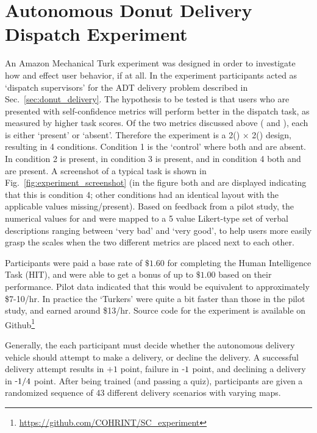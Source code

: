 \section{Autonomous Donut Delivery Dispatch Experiment} \label{sec:exp_results}
An Amazon Mechanical Turk %
experiment was designed in order to investigate how \xQ{} and \xO{} effect user behavior, if at all. In the experiment participants acted as `dispatch supervisors' for the ADT delivery problem described in Sec.~\ref{sec:donut_delivery}. 
The hypothesis to be tested is that users who are presented with self-confidence metrics will perform better in the dispatch task, as measured by higher task scores. 
Of the two \famsec{} metrics discussed above (\xQ{} and \xO), each is either `present' or `absent'. Therefore the experiment is a 2(\xQ) $\times$ 2(\xO) design, resulting in 4 conditions. Condition 1 is the `control' where both \xQ{} and \xO{} are absent. In condition 2 \xQ{} is present, in condition 3 \xO{} is present, and in condition 4 both \xQ{} and \xO{} are present. A screenshot of a typical task is shown in Fig.~\ref{fig:experiment_screenshot} (in the figure both \xQ{} and \xO{} are displayed indicating that this is condition 4; other conditions had an identical layout with the applicable values missing/present). Based on feedback from a pilot study, the numerical values for \xQ{} and \xO{} were mapped to a 5 value Likert-type set of verbal descriptions ranging between `very bad' and `very good', to help users more easily grasp the scales when the two different metrics are placed next to each other.

Participants were paid a base rate of $\$1.60$ for completing the Human Intelligence Task (HIT), and were able to get a bonus of up to $\$1.00$ based on their performance. Pilot data indicated that this would be equivalent to approximately \$7-10/hr. In practice the `Turkers' were quite a bit faster than those in the pilot study, and earned around \$13/hr. Source code for the experiment is available on Github\footnote{\url{https://github.com/COHRINT/SC_experiment}}

Generally, the each participant must decide whether the autonomous delivery vehicle should attempt to make a delivery, or decline the delivery. A successful delivery attempt results in $+1$ point, failure in $\-1$ point, and declining a delivery in $\-1/4$ point. After being trained (and passing a quiz), participants are given a randomized sequence of 43 different delivery scenarios with varying maps.  

